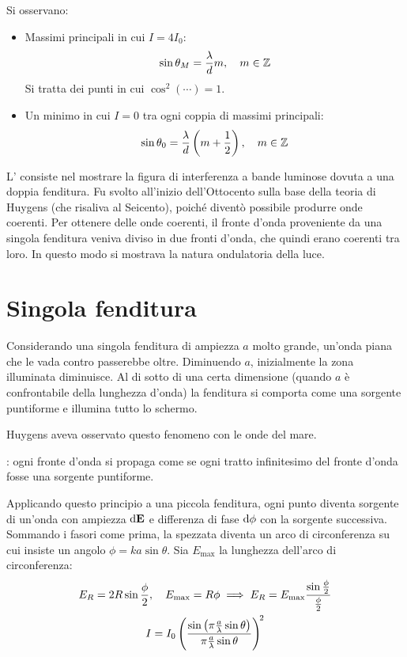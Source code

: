 Si osservano:
\begin{itemize}
    \item Massimi principali in cui $I = 4 I_0$:
        \begin{equation}
            \sin\theta_M = \frac{\lambda}{d} m, \quad m \in \mathbb{Z}
        \end{equation}
        Si tratta dei punti in cui $\cos^2(\cdots) = 1$.
    \item Un minimo in cui $I = 0$ tra ogni coppia di massimi principali:
        \begin{equation}
            \sin\theta_0 = \frac{\lambda}{d} \left( m + \frac{1}{2} \right), \quad
            m \in \mathbb{Z}
        \end{equation}
\end{itemize}

L' consiste nel mostrare la figura di interferenza a bande luminose dovuta a una doppia fenditura.
Fu svolto all'inizio dell'Ottocento sulla base della teoria di Huygens (che risaliva al Seicento), poiché diventò possibile produrre onde coerenti.
Per ottenere delle onde coerenti, il fronte d'onda proveniente da una singola fenditura veniva diviso in due fronti d'onda, che quindi erano coerenti tra loro.
In questo modo si mostrava la natura ondulatoria della luce.


\section{Singola fenditura}

Considerando una singola fenditura di ampiezza $a$ molto grande, un'onda piana che le vada contro passerebbe oltre.
Diminuendo $a$, inizialmente la zona illuminata diminuisce.
Al di sotto di una certa dimensione (quando $a$ è confrontabile della lunghezza d'onda) la fenditura si comporta come una sorgente puntiforme e illumina tutto lo schermo.

Huygens aveva osservato questo fenomeno con le onde del mare.

: ogni fronte d'onda si propaga come se ogni tratto infinitesimo del fronte d'onda fosse una sorgente puntiforme.

Applicando questo principio a una piccola fenditura, ogni punto diventa sorgente di un'onda con ampiezza $\mathrm{d}\mathbf{E}$ e differenza di fase $\mathrm{d}\phi$ con la sorgente successiva.
Sommando i fasori come prima, la spezzata diventa un arco di circonferenza su cui insiste un angolo $\phi = k a \sin\theta$.
Sia $E_\text{max}$ la lunghezza dell'arco di circonferenza:
\begin{gather}
    E_R = 2 R \sin \frac{\phi}{2}, \quad
    E_\text{max} = R \phi
    \implies
    E_R = E_\text{max} \frac{\sin\frac{\phi}{2}}{\frac{\phi}{2}} \\
    I = I_0 \left( \frac{\sin\left( \pi \frac{a}{\lambda} \sin\theta \right)}{\pi \frac{a}{\lambda} \sin\theta} \right)^{\!2}
\end{gather}

